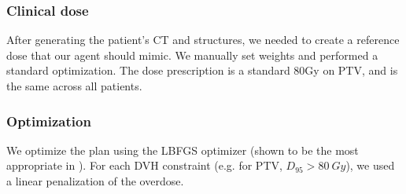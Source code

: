 \subsubsection*{Clinical dose}
After generating the patient's CT and structures, we needed to create a reference dose that our agent should mimic.
We manually set weights and performed a standard optimization.
The dose prescription is a standard 80Gy on PTV, and is the same across all patients.


\subsubsection*{Optimization}
We optimize the plan using the LBFGS optimizer (shown to be the most appropriate in \cite{dubois_radiotherapy_2023}).
For each DVH constraint (e.g. for PTV, $D_{95}>80 \ Gy$), we used a linear penalization of the overdose.
